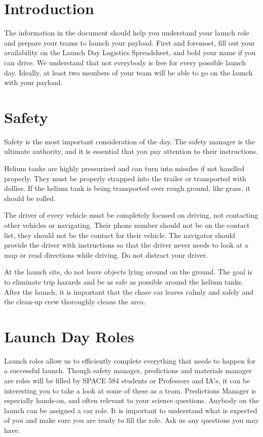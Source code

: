 \documentclass[12pt]{article}
\begin{document}
	\maketitle
	\thispagestyle{fancy}
	
	\section*{Introduction}
	The information in the document should help you understand your launch role and prepare your teams to launch your payload. First and foremost, fill out your availability on the Launch Day Logistics Spreadsheet, and bold your name if you can drive. We understand that not everybody is free for every possible launch day. Ideally, at least two members of your team will be able to go on the launch with your payload. 
	
	\section*{Safety}
	Safety is the most important consideration of the day. The safety manager is the ultimate authority, and it is essential that you pay attention to their instructions. 
	
	Helium tanks are highly pressurized and can turn into missiles if not handled properly. They must be properly strapped into the trailer or transported with dollies. If the helium tank is being transported over rough ground, like grass, it should be rolled.
	
	The driver of every vehicle must be completely focused on driving, not contacting other vehicles or navigating. Their phone number should not be on the contact list, they should not be the contact for their vehicle. The navigator should provide the driver with instructions so that the driver never needs to look at a map or read directions while driving. Do not distract your driver. 
	
	At the launch site, do not leave objects lying around on the ground. The goal is to eliminate trip hazards and be as safe as possible around the helium tanks. After the launch, it is important that the chase car leaves calmly and safely and the clean-up crew thoroughly cleans the area.
	
	\section*{Launch Day Roles}
	Launch roles allow us to efficiently complete everything that needs to happen for a successful launch. Though safety manager, predictions and materials manager are roles will be filled by SPACE 584 students or Professors and IA's, it can be interesting you to take a look at some of these as a team. Predictions Manager is especially hands-on, and often relevant to your science questions. Anybody on the launch can be assigned a car role. It is important to understand what is expected of you and make sure you are ready to fill the role. Ask us any questions you may have.
	
\end{document}
